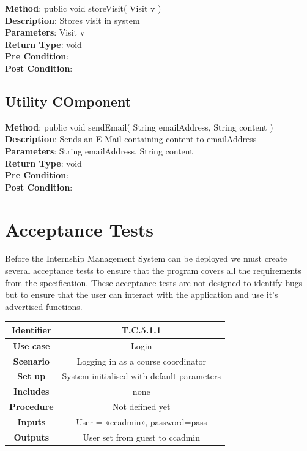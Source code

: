 \documentclass{l3deliverable}
\begin{document}
\textbf{Method}: public void storeVisit( Visit v )\\
\textbf{Description}: Stores visit in system\\
\textbf{Parameters}: Visit v\\
\textbf{Return Type}: void\\
\textbf{Pre Condition}:\\
\textbf{Post Condition}:\\

\subsection{Utility COmponent}
\textbf{Method}: public void sendEmail( String emailAddress, String content ) \\
\textbf{Description}: Sends an E-Mail containing content to emailAddress\\
\textbf{Parameters}: String emailAddress, String content\\
\textbf{Return Type}: void\\
\textbf{Pre Condition}:\\
\textbf{Post Condition}:\\




\section{Acceptance Tests}

Before the Internship Management System can be deployed we must create
several acceptance tests to ensure that the program covers all the
requirements from the specification. These acceptance tests are not
designed to identify bugs but to ensure that the user can interact
with the application and use it's advertised functions.\\

\begin{tabular}{|c|c|}
\hline \textbf{Identifier} & T.C.5.1.1\\
\hline \textbf{Use case} & Login \\
\hline \textbf{Scenario} & Logging in as a course coordinator \\
\hline \textbf{Set up} & System initialised with default parameters\\
\hline \textbf{Includes} & none\\
\hline \textbf{Procedure} & Not defined yet\\
\hline \textbf{Inputs} & User = «ccadmin», password=pass\\
\hline \textbf{Outputs} & User set from guest to ccadmin \\
\hline
\end{tabular}
\end{document}
